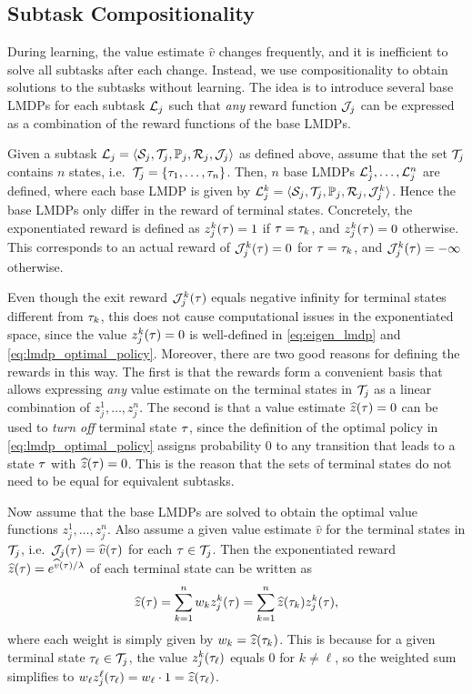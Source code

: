\subsection{Subtask Compositionality}

During learning, the value estimate $\widehat{v}$ changes frequently, and it is inefficient to solve all subtasks after each change. Instead, we use compositionality to obtain solutions to the subtasks without learning. The idea is to introduce several base LMDPs for each subtask $\mathcal{L}_j$ such that {\em any} reward function $\mathcal{J}_j$ can be expressed as a combination of the reward functions of the base LMDPs.

Given a subtask $\mathcal{L}_j=\langle\mathcal{S}_j,\mathcal{T}_j,\mathbb{P}_j,\mathcal{R}_j,\mathcal{J}_j\rangle$ as defined above, assume that the set $\mathcal{T}_j$ contains $n$ states, i.e.~$\mathcal{T}_j=\{\tau_1,\ldots,\tau_n\}$. Then, $n$ base LMDPs $\mathcal{L}_j^1,\ldots,\mathcal{L}_j^n$ are defined, where each base LMDP is given by $\mathcal{L}_j^k=\langle\mathcal{S}_j,\mathcal{T}_j,\mathbb{P}_j,\mathcal{R}_j,\mathcal{J}_j^k\rangle$. Hence the base LMDPs only differ in the reward of terminal states.
Concretely, the exponentiated reward is defined as $z_j^k(\tau)=1$ if $\tau=\tau_k$, and $z_j^k(\tau)=0$ otherwise.
This corresponds to an actual reward of $\mathcal{J}_j^k(\tau)=0$ for $\tau=\tau_k$, and $\mathcal{J}_j^k(\tau)=-\infty$ otherwise.

Even though the exit reward $\mathcal{J}_j^k(\tau)$ equals negative infinity for terminal states different from $\tau_k$, this does not cause computational issues in the exponentiated space, since the value $z_j^k(\tau)=0$ is well-defined in \eqref{eq:eigen_lmdp} and \eqref{eq:lmdp_optimal_policy}.
Moreover, there are two good reasons for defining the rewards in this way. The first is that the rewards form a convenient basis that allows expressing {\em any} value estimate on the terminal states in $\mathcal{T}_j$ as a linear combination of $z_j^1,\ldots,z_j^n$.
The second is that a value estimate $\widehat{z}(\tau)=0$ can be used to {\em turn off} terminal state $\tau$, since the definition of the optimal policy in \eqref{eq:lmdp_optimal_policy} assigns probability $0$ to any transition that leads to a state $\tau$ with $\widehat{z}(\tau)=0$. %
This is the reason that the sets of terminal states do not need to be equal for equivalent subtasks.

Now assume that the base LMDPs are solved to obtain the optimal value functions $z_j^1,\ldots,z_j^n$. Also assume a given value estimate $\widehat{v}$ for the terminal states in $\mathcal{T}_j$, i.e.~$\mathcal{J}_j(\tau)=\widehat{v}(\tau)$ for each $\tau\in\mathcal{T}_j$. Then the exponentiated reward $\widehat{z}(\tau)=e^{\widehat{v}(\tau)/\lambda}$ of each terminal state can be written as
\begin{equation}\label{eq:comp}
\widehat{z}(\tau) = \sum_{k=1}^n w_kz_j^k(\tau) = \sum_{k=1}^n \widehat{z}(\tau_k) z_j^k(\tau),
\end{equation}
where each weight is simply given by $w_k=\widehat{z}(\tau_k)$. This is because for a given terminal state $\tau_\ell\in\mathcal{T}_j$, the value $z_j^k(\tau_\ell)$ equals $0$ for $k\neq \ell$, so the weighted sum simplifies to $w_\ell z_j^\ell(\tau_\ell)=w_\ell\cdot 1=\widehat{z}(\tau_\ell)$.

